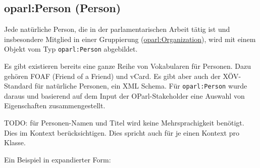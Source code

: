 \documentclass[,a4paper]{article}
\begin{document}
\subsection{oparl:Person (Person)}\label{oparlux5fperson}

Jede natürliche Person, die in der parlamentarischen Arbeit tätig ist
und insbesondere Mitglied in einer Gruppierung
(\hyperref[oparlux5forganization]{oparl:Organization}), wird mit einem
Objekt vom Typ \texttt{oparl:Person} abgebildet.

Es gibt existieren bereits eine ganze Reihe von Vokabularen für
Personen. Dazu gehören FOAF (Friend of a Friend) und vCard. Es gibt aber
auch der XÖV-Standard für natürliche Personen, ein XML Schema. Für
\texttt{oparl:Person} wurde daraus und basierend auf dem Input der
OParl-Stakeholder eine Auswahl von Eigenschaften zusammengestellt.

TODO: für Personen-Namen und Titel wird keine Mehrsprachigkeit benötigt.
Dies im Kontext berücksichtigen. Dies spricht auch für je einen Kontext
pro Klasse.

Ein Beispiel in expandierter Form:
\end{document}
